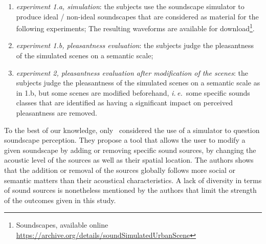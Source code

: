\documentclass[12pt]{elsarticle}
\newcommand{\ie}{\emph{i.\,e.}}
\newcommand{\al}{\emph{et~al.}}
\begin{document}
\begin{enumerate}
\item \emph{experiment 1.a, simulation}:  the subjects use the soundscape simulator to produce ideal / non-ideal soundscapes that are considered as material for the following experiments; The resulting waveforms are available for download\footnote{Soundscapes, available online \url{https://archive.org/details/soundSimulatedUrbanScene}}.
\item \emph{experiment 1.b, pleasantness evaluation}: the subjects judge the pleasantness of the simulated scenes on a semantic scale;
\item \emph{experiment 2, pleasantness evaluation after modification of the scenes}: the subjects judge the pleasantness of the simulated scenes on a semantic scale as in 1.b, but some scenes are modified beforehand, \ie~some specific sounds classes that are identified as having a significant impact on perceived pleasantness are removed.
\end{enumerate}


To the best of our knowledge, only~\cite{bruce2009development,bruce2014effects} considered the use of a simulator to question soundscape perception. They propose a tool that allows the user to modify a given soundscape by adding or removing specific sound sources, by changing the acoustic level of the sources as well as their spatial location. The authors shows that the addition or removal of the sources globally follows more social or semantic matters than their acoustical characteristics. A lack of diversity in terms of sound sources is nonetheless mentioned by the authors that limit the strength of the outcomes given in this study.

\end{document}
